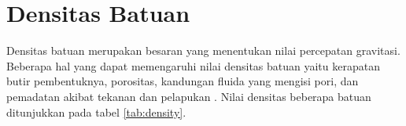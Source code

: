 \section{Densitas Batuan}
\hspace{25pt} Densitas batuan merupakan besaran yang menentukan nilai percepatan gravitasi. Beberapa hal yang dapat memengaruhi nilai densitas batuan yaitu kerapatan butir pembentuknya, porositas, kandungan fluida yang mengisi pori, dan pemadatan akibat tekanan dan pelapukan \citep{Kirbani}. Nilai densitas beberapa batuan ditunjukkan pada tabel \ref{tab:density}.
\begin{table}[h]
	\centering
	\caption{Densitas beberapa jenis batuan (Telford,1990)}
	\label{tab:density}
\end{table}
